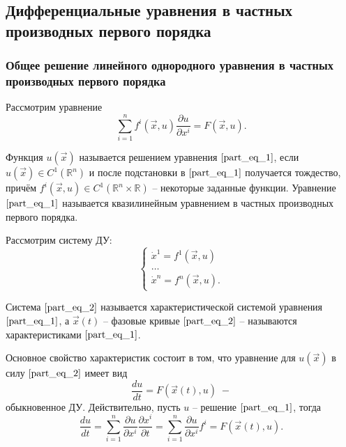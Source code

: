 \subsection{Дифференциальные уравнения в частных производных первого порядка}

\subsubsection{Общее решение линейного однородного уравнения в частных производных первого порядка}

\begin{definition}
	Рассмотрим уравнение
	\begin{equation}
		\sum \limits_{i = 1}^{n} f^{i} \left( \vec{x}, u \right) \frac{\partial u}{\partial x^{i}} = F \left( \vec{x}, u \right).
		\label{part_eq_1}
	\end{equation}
	
	Функция $u \left( \vec{x} \right)$ называется решением уравнения $\eqref{part_eq_1}$, если $u \left( \vec{x} \right) \in C^{1} \left( \mathbb{R}^n \right)$ и после подстановки в $\eqref{part_eq_1}$ получается тождество, причём $f^{i} \left( \vec{x}, u \right) \in C^{1} \left( \mathbb{R}^n \times \mathbb{R} \right)$ -- некоторые заданные функции. Уравнение $\eqref{part_eq_1}$ называется квазилинейным уравнением в частных производных первого порядка. 
\end{definition}

\begin{definition}
	Рассмотрим систему ДУ:
	\begin{equation}
		\begin{cases}
			\dot{x}^1 = f^1 \left( \vec{x}, u \right) \\
			\dots                                                \\
			\dot{x}^n = f^n \left( \vec{x}, u \right).
		\end{cases}
		\label{part_eq_2}
	\end{equation}
	
	Система $\eqref{part_eq_2}$ называется характеристической системой уравнения $\eqref{part_eq_1}$, а $\vec{x} \left( t \right) $ -- фазовые кривые $\eqref{part_eq_2}$ -- называются характеристиками $\eqref{part_eq_1}$.
\end{definition}

Основное свойство характеристик состоит в том, что уравнение для $u \left( \vec{x} \right) $ в силу $\eqref{part_eq_2}$ имеет вид 
\begin{equation*}
	\frac{du}{dt} = F \left( \vec{x} \left( t \right) , u \right) \; -
\end{equation*}
обыкновенное ДУ. Действительно, пусть $u$ -- решение $\eqref{part_eq_1}$, тогда 
\begin{equation*}
	\frac{du}{dt} = \sum \limits_{i = 1}^{n} \frac{\partial u}{\partial x^i} \frac{\partial x^i}{\partial t} = \sum \limits_{i = 1}^{n} \frac{\partial u}{\partial x^i} f^i = F \left( \vec{x} \left( t \right) , u \right).
\end{equation*}

